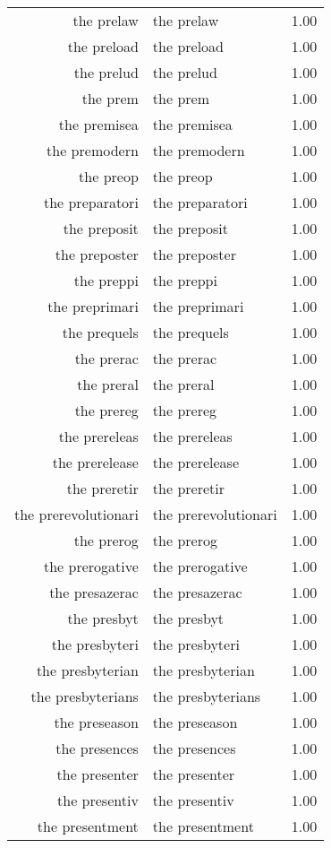 \begin{table}[ht]
\begin{tabular}{rlr}
  the prelaw & the prelaw & 1.00 \\ 
  the preload & the preload & 1.00 \\ 
  the prelud & the prelud & 1.00 \\ 
  the prem & the prem & 1.00 \\ 
  the premisea & the premisea & 1.00 \\ 
  the premodern & the premodern & 1.00 \\ 
  the preop & the preop & 1.00 \\ 
  the preparatori & the preparatori & 1.00 \\ 
  the preposit & the preposit & 1.00 \\ 
  the preposter & the preposter & 1.00 \\ 
  the preppi & the preppi & 1.00 \\ 
  the preprimari & the preprimari & 1.00 \\ 
  the prequels & the prequels & 1.00 \\ 
  the prerac & the prerac & 1.00 \\ 
  the preral & the preral & 1.00 \\ 
  the prereg & the prereg & 1.00 \\ 
  the prereleas & the prereleas & 1.00 \\ 
  the prerelease & the prerelease & 1.00 \\ 
  the preretir & the preretir & 1.00 \\ 
  the prerevolutionari & the prerevolutionari & 1.00 \\ 
  the prerog & the prerog & 1.00 \\ 
  the prerogative & the prerogative & 1.00 \\ 
  the presazerac & the presazerac & 1.00 \\ 
  the presbyt & the presbyt & 1.00 \\ 
  the presbyteri & the presbyteri & 1.00 \\ 
  the presbyterian & the presbyterian & 1.00 \\ 
  the presbyterians & the presbyterians & 1.00 \\ 
  the preseason & the preseason & 1.00 \\ 
  the presences & the presences & 1.00 \\ 
  the presenter & the presenter & 1.00 \\ 
  the presentiv & the presentiv & 1.00 \\ 
  the presentment & the presentment & 1.00 \\ 

\end{tabular}
\end{table}
